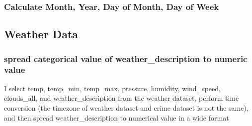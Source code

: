 \documentclass[]{article}
\newenvironment{Shaded}{\begin{snugshade}}{\end{snugshade}}
\newcommand{\KeywordTok}[1]{\textcolor[rgb]{0.13,0.29,0.53}{\textbf{#1}}}
\newcommand{\DataTypeTok}[1]{\textcolor[rgb]{0.13,0.29,0.53}{#1}}
\newcommand{\DecValTok}[1]{\textcolor[rgb]{0.00,0.00,0.81}{#1}}
\newcommand{\StringTok}[1]{\textcolor[rgb]{0.31,0.60,0.02}{#1}}
\newcommand{\OperatorTok}[1]{\textcolor[rgb]{0.81,0.36,0.00}{\textbf{#1}}}
\newcommand{\NormalTok}[1]{#1}
\begin{document}
\subsubsection{Calculate Month, Year, Day of Month, Day of
Week}\label{calculate-month-year-day-of-month-day-of-week}

\begin{Shaded}
\end{Shaded}

\subsection{Weather Data}\label{weather-data-1}

\subsubsection{spread categorical value of weather\_description to
numeric
value}\label{spread-categorical-value-of-weather_description-to-numeric-value}

I select temp, temp\_min, temp\_max, pressure, humidity, wind\_speed,
clouds\_all, and weather\_description from the weather dataset, perform
time conversion (the timezone of weather dataset and crime dataset is
not the same), and then spread weather\_description to numerical value
in a wide format
\end{document}
